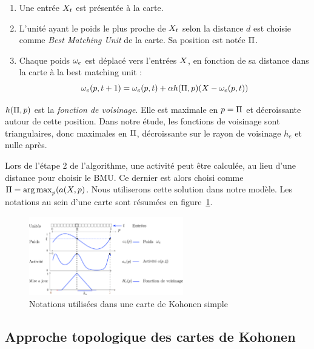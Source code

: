\begin{enumerate}
\item Une entrée $X_t$ est présentée à la carte.
\item L'unité ayant le poids le plus proche de $X_t$ selon la distance $d$ est choisie comme \emph{Best Matching Unit} de la carte. Sa position est notée $\Pi$.
\item Chaque poids $\omega_e$ est déplacé vers l'entrées $X$, en fonction de sa distance dans la carte à la best matching unit : 
\begin{equation}
\omega_e(p,t+1) = \omega_e(p,t) + \alpha h(\Pi,p)(X - \omega_e(p,t))
\label{eq:update}
\end{equation}
\end{enumerate}

$h(\Pi,p)$ est la \emph{fonction de voisinage}. Elle est maximale en $p = \Pi$ et décroissante autour de cette position. Dans notre étude, les fonctions de voisinage sont triangulaires, donc maximales en $\Pi$, décroissante sur le rayon de voisinage $h_e$ et nulle après.

Lors de l'étape 2 de l'algorithme, une activité peut être calculée, au lieu d'une distance pour choisir le BMU. Ce dernier est alors choisi comme $\Pi = \operatorname*{arg\,max}_p (a(X,p)$. Nous utiliserons cette solution dans notre modèle. Les notations au sein d'une carte sont résumées en figure~\ref{fig:one_map_not}.

\begin{figure}
\centering
\includegraphics[width=0.6\textwidth]{one_map_one_layer.pdf}
\caption{Notations utilisées dans une carte de Kohonen simple}
\label{fig:one_map_not}
\end{figure}


\subsection{Approche topologique des cartes de Kohonen}

